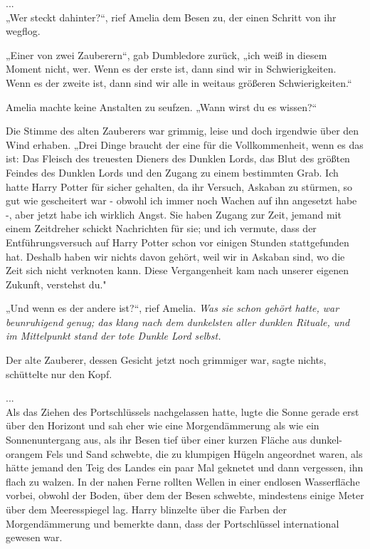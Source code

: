 {...\\ „Wer steckt dahinter?“, rief Amelia dem Besen zu, der einen Schritt von ihr wegflog.

„Einer von zwei Zauberern“, gab Dumbledore zurück, „ich weiß in diesem Moment nicht, wer. Wenn es der erste ist, dann sind wir in Schwierigkeiten. Wenn es der zweite ist, dann sind wir alle in weitaus größeren Schwierigkeiten.“

Amelia machte keine Anstalten zu seufzen. „Wann wirst du es wissen?“

Die Stimme des alten Zauberers war grimmig, leise und doch irgendwie über den Wind erhaben. „Drei Dinge braucht der eine für die Vollkommenheit, wenn es das ist: Das Fleisch des treuesten Dieners des Dunklen Lords, das Blut des größten Feindes des Dunklen Lords und den Zugang zu einem bestimmten Grab. Ich hatte Harry Potter für sicher gehalten, da ihr Versuch, Askaban zu stürmen, so gut wie gescheitert war - obwohl ich immer noch Wachen auf ihn angesetzt habe -, aber jetzt habe ich wirklich Angst. Sie haben Zugang zur Zeit, jemand mit einem Zeitdreher schickt Nachrichten für sie; und ich vermute, dass der Entführungsversuch auf Harry Potter schon vor einigen Stunden stattgefunden hat. Deshalb haben wir nichts davon gehört, weil wir in Askaban sind, wo die Zeit sich nicht verknoten kann. Diese Vergangenheit kam nach unserer eigenen Zukunft, verstehst du."

„Und wenn es der andere ist?“, rief Amelia. \emph{Was sie schon gehört hatte, war beunruhigend genug; das klang nach dem dunkelsten aller dunklen Rituale, und im Mittelpunkt stand der tote Dunkle Lord selbst.}

Der alte Zauberer, dessen Gesicht jetzt noch grimmiger war, sagte nichts, schüttelte nur den Kopf.

...\\ Als das Ziehen des Portschlüssels nachgelassen hatte, lugte die Sonne gerade erst über den Horizont und sah eher wie eine Morgendämmerung als wie ein Sonnenuntergang aus, als ihr Besen tief über einer kurzen Fläche aus dunkel-orangem Fels und Sand schwebte, die zu klumpigen Hügeln angeordnet waren, als hätte jemand den Teig des Landes ein paar Mal geknetet und dann vergessen, ihn flach zu walzen. In der nahen Ferne rollten Wellen in einer endlosen Wasserfläche vorbei, obwohl der Boden, über dem der Besen schwebte, mindestens einige Meter über dem Meeresspiegel lag. Harry blinzelte über die Farben der Morgendämmerung und bemerkte dann, dass der Portschlüssel international gewesen war.

}
